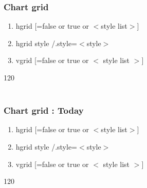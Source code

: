 \documentclass[ aspectratio=169,  12pt,blue,xcolor=pdftex,dvipsnames,table,handout,notes]{beamer}
\begin{document}
		\begin{frame}[t]
		\frametitle{Chart grid}

		\begin{enumerate}
		\item[]	hgrid [=false or true or \(<\)style list\(>\)]
		\item[]	hgrid style /.style=\(<\)style\(>\)
		\item[]	vgrid [=false or true or \(<\) style list \(>\)]
		\end{enumerate}



		\begin{ganttchart}[		hgrid=true,
								vgrid={*2{red},*1{white},*{10}{blue, dashed}}	,
						]{1}{20}
		 \\
		 \\
		\end{ganttchart}



		\end{frame}


		\begin{frame}[t]
		\frametitle{Chart grid : Today}

		\begin{enumerate}
		\item[]	hgrid [=false or true or \(<\)style list\(>\)]
		\item[]	hgrid style /.style=\(<\)style\(>\)
		\item[]	vgrid [=false or true or \(<\) style list \(>\)]
		\end{enumerate}



		\begin{ganttchart}[		hgrid=true,
								vgrid={*2{red},*1{white},*{10}{blue, dashed}}	,
								today=2
						]{1}{20}
		 \\
		 \\
		\end{ganttchart}



		\end{frame}
\end{document}
